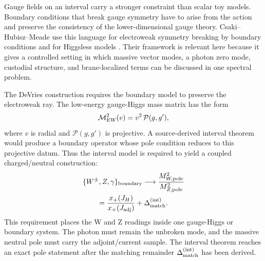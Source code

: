 Gauge fields on an interval carry a stronger constraint than scalar toy models.  Boundary conditions that break gauge symmetry have to arise from the action and preserve the consistency of the lower-dimensional gauge theory.  Csaki--Hubisz--Meade use this language for electroweak symmetry breaking by boundary conditions and for Higgsless models \cite{CsakiHubiszMeade2005}.  Their framework is relevant here because it gives a controlled setting in which massive vector modes, a photon zero mode, custodial structure, and brane-localized terms can be discussed in one spectral problem.

The DeVries construction requires the boundary model to preserve the electroweak ray.  The low-energy gauge-Higgs mass matrix has the form
\begin{equation}
  \mathcal M_{\rm EW}^2(v)
  =
  v^2\,\mathcal P(g,g'),
  \label{eq:ew-ray-boundary}
\end{equation}
where \(v\) is radial and \(\mathcal P(g,g')\) is projective.  A source-derived
interval theorem would produce a boundary operator whose pole condition reduces
to this projective datum.  Thus the interval model is required to yield a
coupled charged/neutral construction:
\begin{equation}
  \begin{gathered}
  \{W^\pm,Z,\gamma\}_{\rm boundary}
  \longrightarrow
  \frac{M_{W,\rm pole}^2}{M_{Z,\rm pole}^2}
  \\
  =
  \frac{x_+(J_H)}{x_+(J_{\rm adj})}
  +\Delta^{(\mathrm{int})}_{\rm match}.
  \end{gathered}
  \label{eq:interval-ew-target}
\end{equation}
This requirement places the W and Z readings inside one gauge-Higgs or boundary system.  The photon must remain the unbroken mode, and the massive neutral pole must carry the adjoint/current sample.  The interval theorem reaches an exact pole statement after the matching remainder \(\Delta^{(\mathrm{int})}_{\rm match}\) has been derived.

